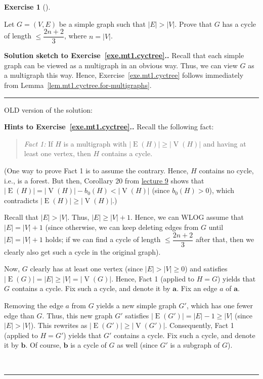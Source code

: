 \documentclass[numbers=enddot,12pt,final,onecolumn,notitlepage]{scrartcl}%
\newcounter{exer}
\theoremstyle{definition}
\newtheorem{exmp}[exer]{Exercise}
\newenvironment{exercise}[1][]
{\begin{exmp}[#1]\begin{leftbar}}
{\end{leftbar}\end{exmp}}
\newenvironment{statement}{\begin{quote}}{\end{quote}}
\newenvironment{proof}[1][Proof]{\noindent\textbf{#1.} }{\ \rule{0.5em}{0.5em}}
\newenvironment{noncompile}{}{}
\newcommand{\abs}[1]{\left| #1 \right|}
\newcommand{\tup}[1]{\left( #1 \right)}
\newcommand{\verts}[1]{\operatorname{V}\left( #1 \right)}
\newcommand{\edges}[1]{\operatorname{E}\left( #1 \right)}
\begin{document}
\begin{exercise} \label{exe.mt1.cyctree}
Let $G = \tup{V, E}$ be a simple graph such that $\abs{E} > \abs{V}$.
Prove that $G$ has a cycle of length $\leq \dfrac{2n+2}{3}$,
where $n = \abs{V}$.
\end{exercise}

\begin{proof}[Solution sketch to Exercise~\ref{exe.mt1.cyctree}.]
Recall that each simple graph can be viewed as a multigraph in an
obvious way. Thus, we can view $G$ as a multigraph this way.
Hence, Exercise~\ref{exe.mt1.cyctree} follows immediately from
Lemma~\ref{lem.mt1.cyctree.for-multigraphs}.
\end{proof}

\begin{noncompile}
OLD version of the solution:

\begin{proof}[Hints to Exercise~\ref{exe.mt1.cyctree}.]
Recall the following fact:
\begin{statement}
\textit{Fact 1:} If $H$ is a multigraph with
$\abs{\edges{H}} \geq \abs{\verts{H}}$ and having at least one vertex,
then $H$ contains a cycle.
\end{statement}
(One way to prove Fact 1 is to assume the contrary. Hence, $H$
contains no cycle, i.e., is a forest. But then, Corollary 20 from
\href{http://www-users.math.umn.edu/~dgrinber/5707s17/5707lec9.pdf}{lecture 9}
shows that
$\abs{\edges{H}} = \abs{\verts{H}} - b_0 \tup{H} < \abs{\verts{H}}$
(since $b_0 \tup{H} > 0$), which contradicts
$\abs{\edges{H}} \geq \abs{\verts{H}}$.)

Recall that $\abs{E} > \abs{V}$. Thus,
$\abs{E} \geq \abs{V} + 1$. Hence, we can WLOG assume that
$\abs{E} = \abs{V} + 1$ (since otherwise, we can keep deleting edges
from $G$ until $\abs{E} = \abs{V} + 1$ holds; if we can find a cycle
of length $\leq \dfrac{2n+2}{3}$ after that, then we clearly also get
such a cycle in the original graph).

Now, $G$ clearly has at least one vertex (since $\abs{E} > \abs{V}
\geq 0$) and satisfies
$\abs{\edges{G}} = \abs{E} \geq \abs{V} = \abs{\verts{G}}$.
Hence, Fact 1 (applied to $H = G$) yields that $G$ contains a
cycle. Fix such a cycle, and denote it by $\mathbf{a}$.
Fix an edge $a$ of $\mathbf{a}$.

Removing the edge $a$ from $G$ yields a new simple graph $G'$, which
has one fewer edge than $G$. Thus, this new graph $G'$ satisfies
$\abs{\edges{G'}} = \abs{E} - 1 \geq \abs{V}$ (since $\abs{E} >
\abs{V}$). This rewrites as
$\abs{\edges{G'}} \geq \abs{\verts{G'}}$.
Consequently, Fact 1 (applied to $H = G'$) yields that $G'$
contains a cycle. Fix such a cycle, and denote it by $\mathbf{b}$.
Of course, $\mathbf{b}$ is a cycle of $G$ as well (since $G'$ is a
subgraph of $G$).


\end{proof}
\end{noncompile}
\end{document}
